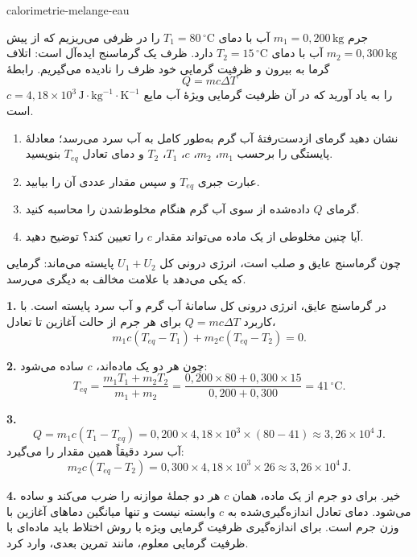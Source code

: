 \begin{exo}{calorimetrie-melange-eau}

جرم $m_1=0{,}200\,\text{kg}$ آب با دمای $T_1=80\,{}^\circ\text{C}$ را در ظرفی می‌ریزیم که از پیش $m_2=0{,}300\,\text{kg}$ آب با دمای $T_2=15\,{}^\circ\text{C}$ دارد. ظرف یک گرماسنج ایده‌آل است: اتلاف گرما به بیرون و ظرفیت گرمایی خود ظرف را نادیده می‌گیریم. رابطهٔ
\[
Q=mc\Delta T
\]
را به یاد آورید که در آن ظرفیت گرمایی ویژهٔ آب مایع $c=4{,}18\times10^3\,\text{J}\!\cdot\!\text{kg}^{-1}\!\cdot\!\text{K}^{-1}$ است.

\begin{enumerate}
  \item نشان دهید گرمای ازدست‌رفتهٔ آب گرم به‌طور کامل به آب سرد می‌رسد؛ معادلهٔ پایستگی را برحسب $m_1$، $m_2$، $c$، $T_1$، $T_2$ و دمای تعادل $T_{eq}$ بنویسید.
  \item عبارت جبری $T_{eq}$ و سپس مقدار عددی آن را بیابید.
  \item گرمای $Q$ داده‌شده از سوی آب گرم هنگام مخلوط‌شدن را محاسبه کنید.
  \item آیا چنین مخلوطی از یک ماده می‌تواند مقدار $c$ را تعیین کند؟ توضیح دهید.
\end{enumerate}

\begin{indication}
چون گرماسنج عایق و صلب است، انرژی درونی کل $U_1+U_2$ پایسته می‌ماند: گرمایی که یکی می‌دهد با علامت مخالف به دیگری می‌رسد.
\end{indication}

\begin{solution}
\textbf{1.} در گرماسنج عایق، انرژی درونی کل سامانهٔ آب گرم و آب سرد پایسته است. با کاربرد $Q=mc\Delta T$ برای هر جرم از حالت آغازین تا تعادل،
\[
m_1c(T_{eq}-T_1)+m_2c(T_{eq}-T_2)=0.
\]

\textbf{2.} چون هر دو یک ماده‌اند، $c$ ساده می‌شود:
\[
T_{eq}=\frac{m_1T_1+m_2T_2}{m_1+m_2}
=\frac{0{,}200\times80+0{,}300\times15}{0{,}200+0{,}300}
=41\,{}^\circ\text{C}.
\]

\textbf{3.}
\[
Q=m_1c(T_1-T_{eq})
=0{,}200\times4{,}18\times10^3\times(80-41)
\approx3{,}26\times10^4\,\text{J}.
\]
آب سرد دقیقاً همین مقدار را می‌گیرد:
\[
m_2c(T_{eq}-T_2)=0{,}300\times4{,}18\times10^3\times26\approx3{,}26\times10^4\,\text{J}.
\]

\textbf{4.} خیر. برای دو جرم از یک ماده، همان $c$ هر دو جملهٔ موازنه را ضرب می‌کند و ساده می‌شود. دمای تعادل اندازه‌گیری‌شده به $c$ وابسته نیست و تنها میانگین دماهای آغازین با وزن جرم است. برای اندازه‌گیری ظرفیت گرمایی ویژه با روش اختلاط باید ماده‌ای با ظرفیت گرمایی معلوم، مانند تمرین بعدی، وارد کرد.
\end{solution}
\end{exo}

